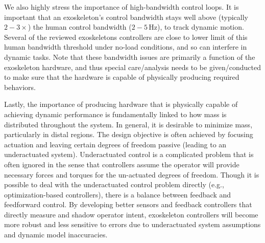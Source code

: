 \documentclass[letterpaper,12pt,fullpage]{article}
\begin{document}
We also highly stress the importance of high-bandwidth control loops.  It is important that an exoskeleton's control bandwidth stays well above (typically $2-3\times$) the human control bandwidth ($2-5\,$Hz), to track dynamic motion.  Several of the reviewed exoskeletons controllers are close to lower limit of this human bandwidth threshold under no-load conditions, and so can interfere in dynamic tasks.  Note that these bandwidth issues are primarily a function of the exoskeleton hardware, and thus special care/analysis needs to be given/conducted to make sure that the hardware is capable of physically producing required behaviors. 

Lastly, the importance of producing hardware that is physically capable of achieving dynamic performance is fundamentally linked to how mass is distributed throughout the system.  In general, it is desirable to minimize mass, particularly in distal regions. The design objective is often achieved by focusing actuation and leaving certain degrees of freedom passive (leading to an underactuated system).  Underactuated control is a complicated problem that is often ignored in the sense that controllers assume the operator will provide necessary forces and torques for the un-actuated degrees of freedom.  Though it is possible to deal with the underactuated control problem directly (e.g., optimization-based controllers), there is a balance between feedback and feedforward control.  
By developing better sensors and feedback controllers that directly measure and shadow operator intent, exoskeleton controllers will become more robust and less sensitive to errors due to underactuated system assumptions and dynamic model inaccuracies.

%



%


\newpage


\end{document}
